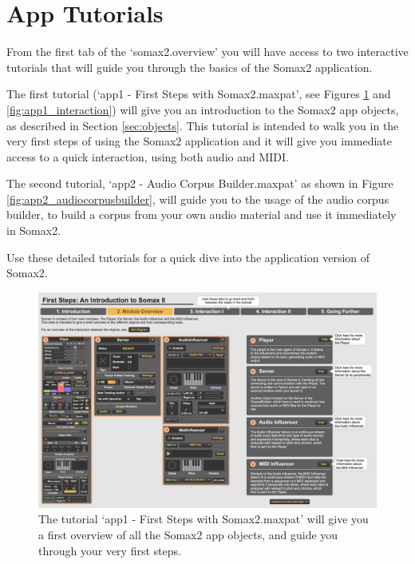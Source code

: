 \section{App Tutorials}

From the first tab of the `somax2.overview' you will have access to two interactive tutorials that will guide you through the basics of the Somax2 application. 

The first tutorial (`app1 - First Steps with Somax2.maxpat', see Figures \ref{fig:app1_overview} and \ref{fig:app1_interaction}) will give you an introduction to the Somax2 app objects, as described in Section \ref{sec:objects}. This tutorial is intended to walk you in the very first steps of using the Somax2 application and it will give you immediate access to a quick interaction, using both audio and MIDI.

The second tutorial, `app2 - Audio Corpus Builder.maxpat' as shown in Figure \ref{fig:app2_audiocorpusbuilder}, will guide you to the usage of the audio corpus builder, to build a corpus from your own audio material and use it immediately in Somax2.

Use these detailed tutorials for a quick dive into the application version of Somax2.

\vspace{30mm}

 \begin{figure}[H]
    \centering        
 	\includegraphics[width=1\textwidth]{img/app1_overview.png}
    \caption{The tutorial `app1 - First Steps with Somax2.maxpat' will give you a first overview of all the Somax2 app objects, and guide you through your very first steps.}
    \label{fig:app1_overview}
\end{figure}


